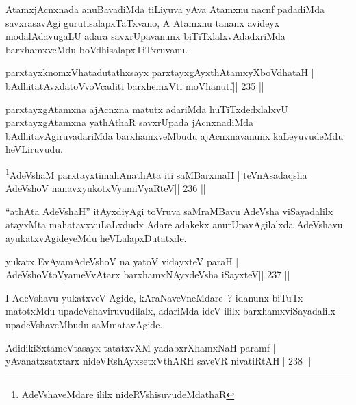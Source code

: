 \begin{artha}
AtamxjAcnxnada anuBavadiMda tiLiyuva yAva Atamxnu nacnf padadiMda savxrasavAgi gurutisalapxTaTxvano, A Atamxnu tananx avideyx modalAdavugaLU adara savxrUpavanunx biTiTxlalxvAdadxriMda barxhamxveMdu boVdhisalapxTiTxruvanu.
\end{artha}

\begin{shl}
parxtayxknomxVhatadutathxsayx parxtayxgAyxthAtamxyXboVdhataH |
bAdhitatAvxdatoV\s voVcaditi barxhemxVti moVhanutf\hfill || 235 ||
\end{shl}

\begin{artha}
parxtayxgAtamxna ajAcnxna matutx adariMda huTiTxdedxlalxvU parxtayxgAtamxna yathAthaR savxrUpada jAcnxnadiMda bAdhitavAgiruvadariMda barxhamxveMbudu ajAcnxnavanunx kaLeyuvudeMdu heVLiruvudu.
\end{artha}



\begin{shl}
\footnote{AdeVshaveMdare ililx nideRVshisuvudeMdathaR}AdeVshaM parxtayxtimahAnathAta iti saMBarxmaH |
teVnAsadaqsha AdeVshoV nanavxyukotxV\s yamiVyaRteV\hfill || 236 ||
\end{shl}

\begin{artha}
``athAta AdeVshaH'' itAyxdiyAgi toVruva saMraMBavu AdeVsha
  viSayadalilx atayxMta mahatavxvuLaLxdudx Adare adakekx
  anurUpavAgilalxda AdeVshavu ayukatxvAgideyeMdu heVLalapxDutatxde.
\end{artha}


\begin{shl}
yukatx EvAyamAdeVshoV na yatoV vidayxteV paraH |
AdeVshoV\s toV\s yameVvAtarx barxhamxNAyxdeVsha iSayxteV\hfill || 237 ||
\end{shl}

\begin{artha}
I AdeVshavu yukatxveV Agide, kAraNaveVneMdare~? idanunx biTuTx matotxMdu upadeVshaviruvudilalx, adariMda ideV ililx barxhamxviSayadalilx upadeVshaveMbudu saMmatavAgide.
\end{artha}

\begin{shl}
AdidikiSxtameVtasayx tatatxvXM yadabxrXhamxNaH paramf |
yAvanatxsatxtarx nideVRshAyxsetxV\s thARH saveVR nivatiRtAH\hfill || 238 ||
\end{shl}

